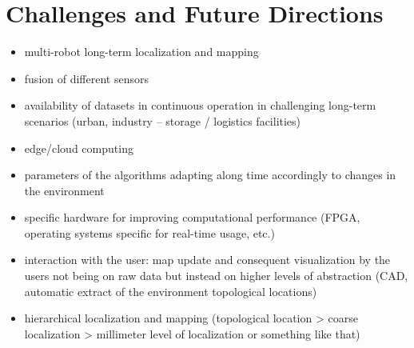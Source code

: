 \section{Challenges and Future Directions}
\label{sec:future}

\begin{itemize}[nosep]
\item multi-robot long-term localization and mapping
\item fusion of different sensors
\item availability of datasets in continuous operation in challenging long-term scenarios (urban, industry -- storage / logistics facilities)
\item edge/cloud computing
\item parameters of the algorithms adapting along time accordingly to changes in the environment
\item specific hardware for improving computational performance (FPGA, operating systems specific for real-time usage, etc.)
\item interaction with the user: map update and consequent visualization by the users not being on raw data but instead on higher levels of abstraction (CAD, automatic extract of the environment topological locations)
\item hierarchical localization and mapping (topological location > coarse localization > millimeter level of localization or  something like that)
\end{itemize}

